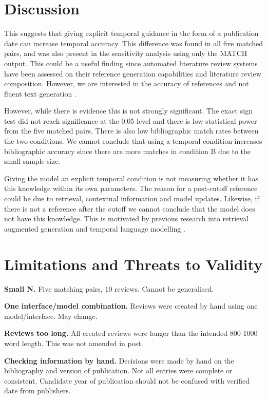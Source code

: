 \documentclass[manuscript]{acmart}
\begin{document}
\section{Discussion}
This suggests that giving explicit temporal guidance in the form of a publication date can increase temporal accuracy. This difference was found in all five matched pairs, and was also present in the sensitivity analysis using only the MATCH output. This could be a useful finding since automated literature review systems have been assessed on their reference generation capabilities and literature review composition. However, we are interested in the accuracy of references and not fluent text generation \cite{kasanishi2023scireviewgen,chelli2024hallucination}.

However, while there is evidence this is not strongly significant. The exact sign test did not reach significance at the 0.05 level and there is low statistical power from the five matched pairs. There is also low bibliographic match rates between the two conditions. We cannot conclude that using a temporal condition increases bibliographic accuracy since there are more matches in condition B due to the small sample size.

Giving the model an explicit temporal condition is not measuring whether it has this knowledge within its own parameters. The reason for a post-cutoff reference could be due to retrieval, contextual information and model updates. Likewise, if there is not a reference after the cutoff we cannot conclude that the model does not have this knowledge. This is motivated by previous research into retrieval augmented generation and temporal language modelling \cite{lewis2020rag,dhingra2022timeaware}.
\section{Limitations and Threats to Validity}
\textbf{ Small N. } Five matching pairs, 10 reviews. Cannot be generalised.

\textbf{ One interface/model combination. } Reviews were created by hand using one model/interface. May change.

\textbf{ Reviews too long. } All created reviews were longer than the intended 800-1000 word length. This was not amended in post.

\textbf{ Checking information by hand. } Decisions were made by hand on the bibliography and version of publication. Not all entries were complete or consistent. Candidate year of publication should not be confused with verified date from publishers.
\end{document}
